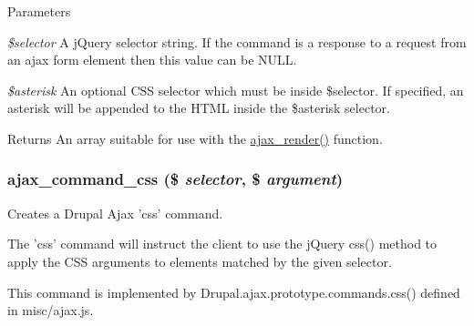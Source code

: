 \begin{DoxyParams}{Parameters}
\item[{\em \$selector}]A jQuery selector string. If the command is a response to a request from an ajax form element then this value can be NULL. \item[{\em \$asterisk}]An optional CSS selector which must be inside \$selector. If specified, an asterisk will be appended to the HTML inside the \$asterisk selector.\end{DoxyParams}
\begin{DoxyReturn}{Returns}
An array suitable for use with the \hyperlink{group__ajax_ga241c2426bdde049c55b05b7bf5d714a2}{ajax\_\-render()} function. 
\end{DoxyReturn}
\hypertarget{group__ajax__commands_gafb1f836e8545dad1a4a391e21404fb86}{
\subsubsection[{ajax\_\-command\_\-css}]{\setlength{\rightskip}{0pt plus 5cm}ajax\_\-command\_\-css (\$ {\em selector}, \/  \$ {\em argument})}}
\label{group__ajax__commands_gafb1f836e8545dad1a4a391e21404fb86}
Creates a Drupal Ajax 'css' command.

The 'css' command will instruct the client to use the jQuery css() method to apply the CSS arguments to elements matched by the given selector.

This command is implemented by Drupal.ajax.prototype.commands.css() defined in misc/ajax.js.


